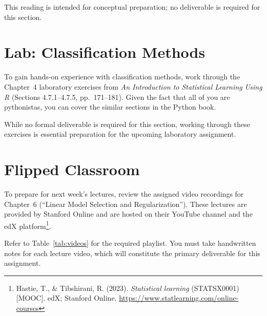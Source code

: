 \documentclass{article}
\begin{document}
This reading is intended for conceptual preparation; no deliverable is required for this section.

\section{Lab: Classification Methods}
\label{sec:lab}

To gain hands-on experience with classification methods, work through the Chapter~4 laboratory exercises from \textit{An Introduction to Statistical Learning Using R} (Sections 4.7.1--4.7.5, pp.~171--181). Given the fact that all of you are pythonistas, you can cover the similar sections in the Python book.

While no formal deliverable is required for this section, working through these exercises is essential preparation for the upcoming laboratory assignment.

\section{Flipped Classroom}
\label{sec:flipped}

To prepare for next week's lectures, review the assigned video recordings for Chapter~6 (``Linear Model Selection and Regularization''). These lectures are provided by Stanford Online and are hosted on their YouTube channel and the edX platform\footnote{Hastie, T., \& Tibshirani, R. (2023). \textit{Statistical learning} (STATSX0001) [MOOC]. edX; Stanford Online. \url{https://www.statlearning.com/online-courses}}.

Refer to Table~\ref{tab:videos} for the required playlist. You must take handwritten notes for each lecture video, which will constitute the primary deliverable for this assignment.
\end{document}
